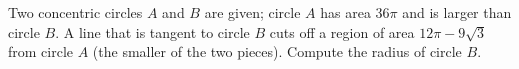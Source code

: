 Two concentric circles $A$ and $B$ are given; circle $A$ has area $36\pi$ and is larger than circle $B$. A line that is tangent to circle $B$ cuts off a region of area $12\pi-9\sqrt3$ from circle $A$ (the smaller of the two pieces). Compute the radius of circle $B$.

